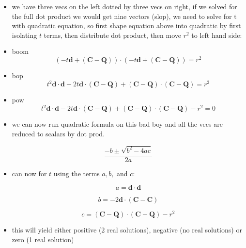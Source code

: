 \begin{itemize}
    \item we have three vecs on the left dotted by three vecs on right, if we
        solved for the full dot product we would get nine vectors (slop), we
        need to solve for t with quadratic equation, so first shape equation
        above into quadratic by first isolating $t$ terms, then distribute dot
        product, then move $r^{2}$ to left hand side:

    \item boom
        \begin{equation}
            (-t\mathbf{d}+(\mathbf{C}-\mathbf{Q})) \cdot
            (-t\mathbf{d}+(\mathbf{C}-\mathbf{Q})) = r^{2}
        \end{equation}

    \item bop
        \begin{equation}
            t^{2}\mathbf{d}\cdot \mathbf{d} - 2t\mathbf{d} \cdot
            (\mathbf{C}-\mathbf{Q}) + (\mathbf{C}-\mathbf{Q}) \cdot
            (\mathbf{C}-\mathbf{Q}) = r^{2}
        \end{equation}

    \item pow
        \begin{equation}
            t^{2}\mathbf{d}\cdot \mathbf{d} - 2t\mathbf{d} \cdot
            (\mathbf{C}-\mathbf{Q}) + (\mathbf{C}-\mathbf{Q}) \cdot
            (\mathbf{C}-\mathbf{Q}) - r^{2} = 0
        \end{equation}

    \item we can now run quadratic formula on this bad boy and all the vecs are
        reduced to scalars by dot prod.

        \begin{equation}
            \frac{-b\pm \sqrt{b^{2}-4ac}}{2a}
        \end{equation}

    \item can now for $t$ using the terms $a, b,$ and $c$:

        \begin{equation}
            a = \mathbf{d}\cdot \mathbf{d}
        \end{equation}

        \begin{equation}
            b = -2\mathbf{d}\cdot (\mathbf{C}-\mathbf{C})
        \end{equation}

        \begin{equation}
            c = (\mathbf{C}-\mathbf{Q}) \cdot (\mathbf{C}-\mathbf{Q}) - r^{2}
        \end{equation}
    \item this will yield either positive (2 real solutions), negative (no real
        solutions) or zero (1 real solution)


\end{itemize}
